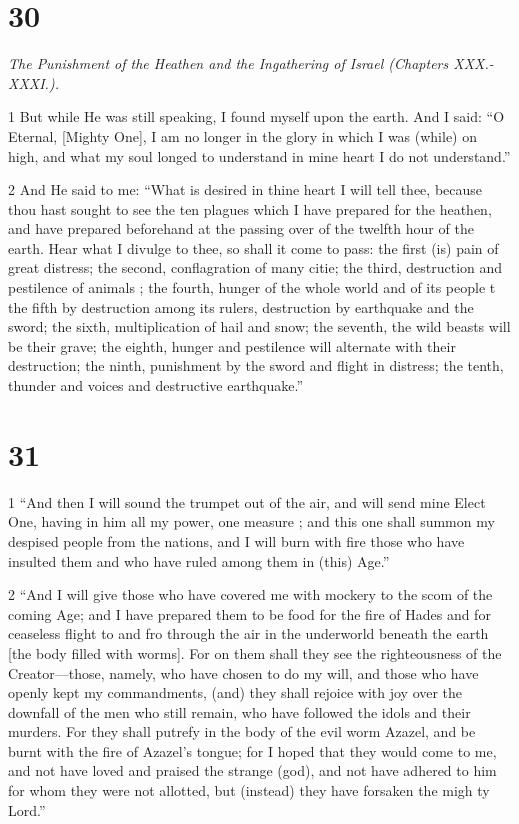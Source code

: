 \chapter{30}

\par \textit{The Punishment of the Heathen and the Ingathering of Israel (Chapters XXX.-XXXI.).}

\par 1 But while He was still speaking, I found myself upon the earth. And I said: “O Eternal, [Mighty One], I am no longer in the glory in which I was (while) on high, and what my soul longed to understand in mine heart I do not understand.”

\par 2 And He said to me: “What is desired in thine heart I will tell thee, because thou hast sought to see the ten plagues which I have prepared for the heathen, and have prepared beforehand at the passing over of the twelfth hour of the earth. Hear what I divulge to thee, so shall it come to pass: the first (is) pain of great distress; the second, conflagration of many citie; the third, destruction and pestilence of animals ; the fourth, hunger of the whole world and of its people t the fifth by destruction among its rulers, destruction by earthquake and the sword; the sixth, multiplication of hail and snow; the seventh, the wild beasts will be their grave; the eighth, hunger and pestilence will alternate with their destruction; the ninth, punishment by the sword and flight in distress; the tenth, thunder and voices and destructive earthquake.”

\chapter{31}

\par 1 “And then I will sound the trumpet out of the air, and will send mine Elect One, having in him all my power, one measure ; and this one shall summon my despised people from the nations, and I will burn with fire those who have insulted them and who have ruled among them in (this) Age.”

\par 2 “And I will give those who have covered me with mockery to the scom of the coming Age; and I have prepared them to be food for the fire of Hades and for ceaseless flight to and fro through the air in the underworld beneath the earth [the body filled with worms]. For on them shall they see the righteousness of the Creator—those, namely, who have chosen to do my will, and those who have openly kept my commandments, (and) they shall rejoice with joy over the downfall of the men who still remain, who have followed the idols and their murders. For they shall putrefy in the body of the evil worm Azazel, and be burnt with the fire of Azazel's tongue; for I hoped that they would come to me, and not have loved and praised the strange (god), and not have adhered to him for whom they were not allotted, but (instead) they have forsaken the migh ty Lord.”


